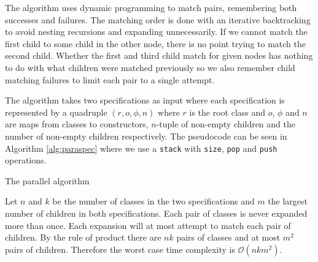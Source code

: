 The algorithm uses dynamic programming to match pairs, remembering both successes and failures. The matching order is done with an iterative backtracking to avoid nesting recursions and expanding unnecessarily. If we cannot match the first child to some child in the other node, there is no point trying to match the second child. Whether the first and third child match for given nodes has nothing to do with what children were matched previously so we also remember child matching failures to limit each pair to a single attempt.

The algorithm takes two specifications as input where each specification is represented by a quadruple $(r,o,\phi,n)$ where $r$ is the root class and $o$, $\phi$ and $n$ are maps from classes to constructors, $n$-tuple of non-empty children and the number of non-empty children respectively. The pseudocode can be seen in Algorithm \ref{alg:paraspec} where we use a \texttt{stack} with \texttt{size}, \texttt{pop} and \texttt{push} operations. 

\begin{algorithm}

\caption{The parallel algorithm}
\label{alg:paraspec}
\end{algorithm}

Let $n$ and $k$ be the number of classes in the two specifications and $m$ the largest number of children in both specifications. Each pair of classes is never expanded more than once. Each expansion will at most attempt to match each pair of children. By the rule of product there are $nk$ pairs of classes and at most $m^2$ pairs of children. Therefore the worst case time complexity is $\mathcal{O}(nkm^2)$.